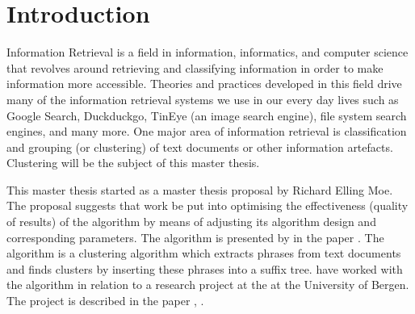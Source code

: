 
\chapter{Introduction} %

\label{Introduction}



Information Retrieval is a field in information, informatics, and computer science that revolves around retrieving and classifying information in order to make information more accessible. Theories and practices developed in this field drive many of the information retrieval systems we use in our every day lives such as Google Search, Duckduckgo, TinEye (an image search engine), file system search engines, and many more. One major area of information retrieval is classification and grouping (or clustering) of text documents or other information artefacts. Clustering will be the subject of this master thesis.

This master thesis started as a master thesis proposal by Richard Elling Moe. The proposal suggests that work be put into optimising the effectiveness (quality of results) of the \STC algorithm by means of adjusting its algorithm design and corresponding parameters. The \STC algorithm is presented by \textcite{Oren1998} in the paper . The algorithm is a clustering algorithm which extracts phrases from text documents and finds clusters by inserting these phrases into a suffix tree. \cite{Moe2013compact} have worked with the \STC algorithm in relation to a research project at the \deptname at the University of Bergen. The project is described in the paper , \cite{Elgesem2009}.

